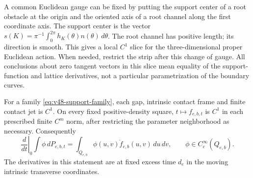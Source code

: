 A common Euclidean gauge can be fixed by putting the support center of
a root obstacle at the origin and the oriented axis of a root channel
along the first coordinate axis.  The support center is the vector
$s(K)=\pi^{-1}\int_0^{2\pi}h_K(\theta)n(\theta)\,d\theta$.
The root channel has positive length; its direction is smooth.  This
gives a local $C^1$ slice for the three-dimensional proper Euclidean
action.  When needed, restrict the strip after this change of gauge.
All conclusions about zero tangent vectors in this slice mean equality
of the support-function and lattice derivatives, not a particular
parametrization of the boundary curves.

\begin{lemma}
\label{lem:v48-forward-C1}
For a family \eqref{eq:v48-support-family}, each gap, intrinsic contact
frame and finite contact jet is $C^1$.  On every fixed positive-density
square, $t\mapsto f_{e,b,t}$ is $C^1$ in each prescribed finite $C^m$
norm, after restricting the parameter neighborhood as necessary.
Consequently
\begin{equation}\label{eq:v48-test-derivative}
 \left.\frac{d}{dt}\right|_{0}\int\phi\,dP_{e,b,t}
       =\int_{Q_{e,b}}\phi(u,v)\dot f_{e,b}(u,v)\,du\,dv,
       \qquad \phi\in C_c^\infty(Q_{e,b}).
\end{equation}
The derivatives in this statement are at fixed excess time $d_e$ in
the moving intrinsic transverse coordinates.
\end{lemma}

